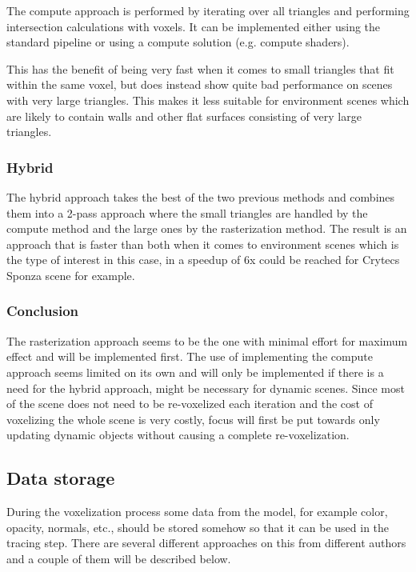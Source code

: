 \documentclass[a4paper, 12pt]{article}
\begin{document}
The compute approach is performed by iterating over all triangles and performing intersection calculations with voxels. It can be implemented either using the standard pipeline or using a compute solution (e.g. compute shaders).

This has the benefit of being very fast when it comes to small triangles that fit within the same voxel, but does instead show quite bad performance on scenes with very large triangles. This makes it less suitable for environment scenes which are likely to contain walls and other flat surfaces consisting of very large triangles. 

\subsubsection{Hybrid}

The hybrid approach takes the best of the two previous methods and combines them into a 2-pass approach where the small triangles are handled by the compute method and the large ones by the rasterization method. The result is an approach that is faster than both when it comes to environment scenes which is the type of interest in this case, in \cite{phdthesis} a speedup of 6x could be reached for Crytecs Sponza scene for example.

\subsubsection{Conclusion}

The rasterization approach seems to be the one with minimal effort for maximum effect and will be implemented first. The use of implementing the compute approach seems limited on its own and will only be implemented if there is a need for the hybrid approach, might be necessary for dynamic scenes. Since most of the scene does not need to be re-voxelized each iteration and the cost of voxelizing the whole scene is very costly, focus will first be put towards only updating dynamic objects without causing a complete re-voxelization.

\subsection{Data storage}

During the voxelization process some data from the model, for example color, opacity, normals, etc., should be stored somehow so that it can be used in the tracing step. There are several different approaches on this from different authors and a couple of them will be described below.
\end{document}

